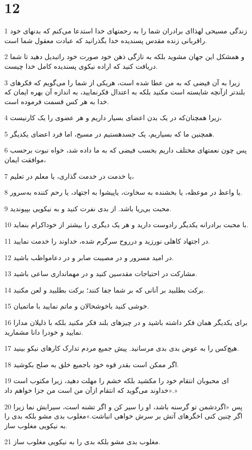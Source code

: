 \chapter{12}

\par 1 زندگی مسیحی لهذا‌ای برادران شما را به رحمتهای خدا استدعا می‌کنم که بدنهای خود راقربانی زنده مقدس پسندیده خدا بگذرانید که عبادت معقول شما است.
\par 2 و همشکل این جهان مشوید بلکه به تازگی ذهن خود صورت خود راتبدیل دهید تا شما دریافت کنید که اراده نیکوی پسندیده کامل خدا چیست.
\par 3 زیرا به آن فیضی که به من عطا شده است، هریکی از شما را می‌گویم که فکرهای بلندتر ازآنچه شایسته است مکنید بلکه به اعتدال فکرنمایید، به اندازه آن بهره ایمان که خدا به هر کس قسمت فرموده است.
\par 4 زیرا همچنان‌که در یک بدن اعضای بسیار داریم و هر عضوی را یک کارنیست،
\par 5 همچنین ما که بسیاریم، یک جسدهستیم در مسیح، اما فرد اعضای یکدیگر.
\par 6 پس چون نعمتهای مختلف داریم بحسب فیضی که به ما داده شد، خواه نبوت برحسب موافقت ایمان،
\par 7 یا خدمت در خدمت گذاری، یا معلم در تعلیم،
\par 8 یا واعظ در موعظه، یا بخشنده به سخاوت، یاپیشوا به اجتهاد، یا رحم کننده به‌سرور.
\par 9 محبت بی‌ریا باشد. از بدی نفرت کنید و به نیکویی بپیوندید.
\par 10 با محبت برادرانه یکدیگر رادوست دارید و هر یک دیگری را بیشتر از خوداکرام بنماید.
\par 11 در اجتهاد کاهلی نورزید و درروح سرگرم شده، خداوند را خدمت نمایید.
\par 12 در امید مسرور و در مصیبت صابر و در دعامواظب باشید.
\par 13 مشارکت در احتیاجات مقدسین کنید و در مهمانداری ساعی باشید.
\par 14 برکت بطلبید بر آنانی که بر شما جفا کنند؛ برکت بطلبید و لعن مکنید.
\par 15 خوشی کنید باخوشحالان و ماتم نمایید با ماتمیان.
\par 16 برای یکدیگر همان فکر داشته باشید و در چیزهای بلند فکر مکنید بلکه با ذلیلان مدارا نمایید و خودرا دانا مشمارید.
\par 17 هیچ‌کس را به عوض بدی بدی مرسانید. پیش جمیع مردم تدارک کارهای نیکو بینید.
\par 18 اگر ممکن است بقدر قوه خود باجمیع خلق به صلح بکوشید.
\par 19 ‌ای محبوبان انتقام خود را مکشید بلکه خشم را مهلت دهید، زیرا مکتوب است «خداوند می‌گوید که انتقام ازآن من است من جزا خواهم داد.»
\par 20 پس «اگردشمن تو گرسنه باشد، او را سیر کن و اگر تشنه است، سیرابش نما زیرا اگر چنین کنی اخگرهای آتش بر سرش خواهی انباشت.»مغلوب بدی مشو بلکه بدی را به نیکویی مغلوب ساز.
\par 21 مغلوب بدی مشو بلکه بدی را به نیکویی مغلوب ساز.


